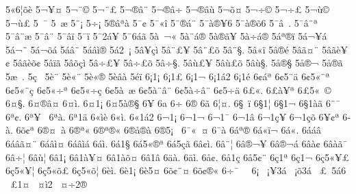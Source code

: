 {5^^ab6^^a6^^f5^^e8
5^^ac^^a5^^a4
5^^ac^^a8^^a9
5^^ac^^a8^^ad^^a3
5^^ac^^ae^^e2^^a8
5^^ac^^ae^^e2^^f7
5^^ac^^ae^^e2^^f9
5^^ac^^f5^^a4
5^^ac^^f7^^a9
5^^ac^^f7^^ad^^a3
5^^ac^^f9^^a9
5^^ac^^f9^^ad^^a3
5^^ad^^a0^^af
5^^ad^^a0^^e6
5^^ad^^a8^^a1
5^^ad^^f7^^a1
5^^ae^^e2^^aa^^e0
5^^af^^a2
5^^af^^ab^^ee
5^^af^^ae^^e1^^a8
5^^af^^e0^^ae^^a56
5^^af^^e0^^ae^^f56
5^^af^^e2^^a0.
5^^af^^e2^^a8^^aa^^a0
5^^af^^e2^^a8^^e6
5^^af^^e2^^a8
5^^af^^e2^^ef
5^^af^^ef
5^^af2^^e1^^a5
5^^af6^^e1^^e3
5^^e0^^a0^^ac^^ab
5^^e0^^a8^^e1^^ae
5^^e0^^ae^^e3^^a5
5^^e0^^f7^^e1^^ae
5^^e1^^aa^^ae^^ef
5^^e1^^ac^^a5^^e1
5^^e1^^ac^^a8
5^^e1^^ac^^f5^^e1
5^^e1^^e2^^a8
5^^e1^^e2^^ec^^ae
5^^e12^^ad^^a0^^a1
5^^e2^^a5^^e7^^ec
5^^e2^^a8^^a3^^a5
5^^e2^^a8^^a3^^f5
5^^e2^^a8^^a7.
5^^e2^^ab^^ef
5^^e2^^ae^^e9
5^^e2^^e3^^a4^^a8
5^^e2^^e3^^e8^^a5^^a2
5^^e2^^e3^^e8^^f5^^a2
5^^e2^^ef^^ad^^e3
5^^e2^^f5^^e7^^ec
5^^e2^^f7^^a3^^a5
5^^e2^^f7^^a3^^f5
5^^e2^^f7^^a7.
5^^e2^^f9^^a3^^a5
5^^e2^^f9^^a3^^f5
5^^e2^^f9^^a7.
5^^e5^^ae^^a7
5^^e5^^ae^^ac
5^^e5^^ae^^e3
5^^e6^^a0.
5^^e7^^a0^^ad
5^^e8^^a8
5^^e8^^ab^^a8
5^^e8^^ab^^ae
5^^e8^^e2^^e0
5^^e9^^ef
6^^a11^^a1
6^^a11^^a3
6^^a11^^ac
6^^a11^^e12
6^^a11^^e9
6^^a2^^e1^^aa
6^^a25^^a8^^ad^^e4
6^^a25^^ab^^a8^^aa
6^^a25^^ab^^a8^^e7
6^^a25^^ab^^f7^^aa
6^^a25^^ab^^f7^^e7
6^^a25^^e0^^a0^^e6
6^^a25^^e0^^a8^^e2^^a8
6^^a25^^e0^^f7^^e2^^a8
6^^a25^^f7^^ad^^e4
6^^a3^^ab.
6^^a3^^e0^^a5^^aa
6^^a35^^ab^^a0^^a9
6^^a4^^a7.
6^^a4^^ae^^e2^^a4
6^^a4^^ec.
6^^a41^^a1
6^^a45^^e0^^ae^^a7
6^^a5
6a
6^^f7
6^^ae
6^^e3
6^^a6^^a4.
6^^a7^^ad^^a0^^ef
6^^a71^^a6
6^^a71^^ac
6^^a71^^e0^^e3
6^^a8^^af
6^^aa^^a2.
6^^aa^^a5^^a0
6^^aa^^e0.
6^^aa1^^e4
6^^ab^^ec^^e8
6^^ab^^ec.
6^^ab1^^e12
6^^ac1^^a1
6^^ac1^^ac
6^^ac1^^af
6^^ac1^^e2
6^^ac1^^e7^^a5
6^^ac1^^e7^^f5
6^^ad^^a5^^a2^^aa
6^^ad^^e0.
6^^ad^^f5^^a2^^aa
6^^ae^^a4^^a0^^e0
6^^ae^^aa^^ab
6^^ae^^aa^^ae^^ab
6^^ae^^e5^^ae^^e0
6^^ae5^^a1^^a0
6^^af^^ab^^a0^^ad^^a4
6^^af^^e0^^ad
6^^e1^^aa^^ae^^ad
6^^e1^^ab^^ef^^ac
6^^e1^^ab.
6^^e1^^e1^^e2
6^^e1^^e2^^e3^^a4^^a8
6^^e1^^e2^^ec^^a4
6^^e1^^e2^^ec^^e1
6^^e1^^ec.
6^^e11^^a7
6^^e15^^ab^^ae^^aa
6^^e15^^e7^^e3
6^^e2^^a2^^ec.
6^^e2^^a8^^ad^^a6
6^^e2^^ae^^ac^^a5
6^^e2^^ae^^ac^^e1
6^^e2^^e0^^a2
6^^e2^^e0^^e3^^af
6^^e2^^f7^^ad^^a6
6^^e2^^f9^^ad^^a6
6^^e21^^a1
6^^e21^^e0^^a5^^a4
6^^e21^^e0^^f5^^a4
6^^e21^^e2
6^^e4^^e0.
6^^e4^^ec.
6^^e5^^a2.
6^^e51^^e7
6^^e55^^a2^^a8
6^^e71^^aa
6^^e71^^ac
6^^e75^^ab^^a5^^a3
6^^e75^^ab^^a5^^a6
6^^e75^^ab^^f5^^a3
6^^e75^^ab^^f5^^a6
6^^e8^^ec.
6^^e81^^a1
6^^e85^^a4
6^^f5^^a2^^a8^^a4
6^^f5^^a2^^ae^^ab
6^^f7^^af
^^a0^^a06^^a1
^^a0^^a1^^a53^^e1
^^a0^^a1^^f53^^e1
^^a0^^a3^^a05^^e16
^^a0^^a31^^a4
^^a0^^a4^^ec2
^^a0^^a4^^f72^^ae
}
